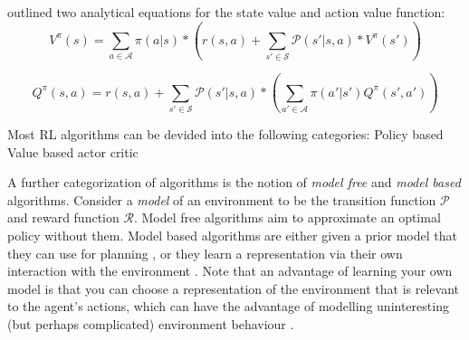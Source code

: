 \documentclass{../main.tex}{subfiles}
\begin{document}
\cite{Bellman1957} outlined two analytical equations for the state value and action value function:
\begin{equation}\label{equation:bellman:state-value-function}
V^{\pi}(s) = \sum_{a \in \mathcal{A}} \pi(a | s) * (r(s, a) + \sum_{s' \in \mathcal{S}} \mathcal{P}(s' | s, a) * V^{\pi}(s'))
\end{equation}

\begin{equation}\label{equation:bellman:action-value-function}
Q^{\pi}(s, a) = r(s, a) + \sum_{s' \in \mathcal{S}} \mathcal{P}(s' | s, a) * (\sum_{a' \in \mathcal{A}} \pi(a' | s') Q^{\pi}(s', a'))
\end{equation}


Most RL algorithms can be devided into the following categories:
Policy based
Value based
actor critic

A further categorization of algorithms is the notion of \textit{model free} and \textit{model based} algorithms. Consider a \textit{model} of an environment to be the transition function $\mathcal{P}$ and reward function $\mathcal{R}$. Model free algorithms aim to approximate an optimal policy without them. Model based algorithms are either given a prior model that they can use for planning \citep{browne2012survey}, or they learn a representation via their own interaction with the environment \citep{Guzdial2017}. Note that an advantage of learning your own model is that you can choose a representation of the environment that is relevant to the agent's actions, which can have the advantage of modelling uninteresting (but perhaps complicated) environment behaviour \citep{Pathak2017}.
\end{document}
